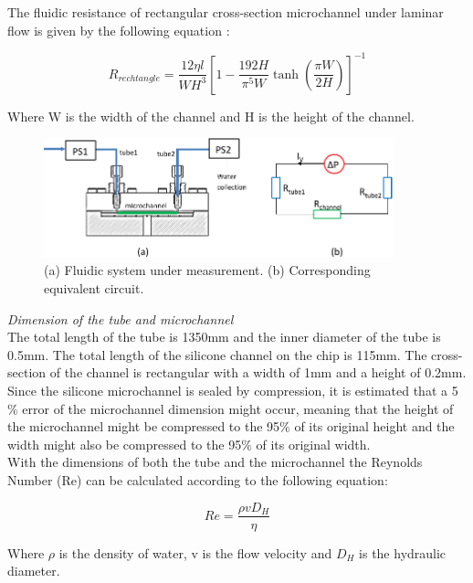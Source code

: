 The fluidic resistance of rectangular cross-section microchannel under laminar flow is given by the following equation \cite{fuerstman2007pressure}:

\begin{equation}
    R_{rechtangle} = \frac{12\eta l}{WH^3}[1-\frac{192H}{\pi ^5 W}\tanh{(\frac{\pi W}{2H})}]^{-1}
    \label{equation4_8}
\end{equation}

Where W is the width of the channel and H is the height of the channel.

\begin{figure}[ht]%
\centering
\includegraphics[width=0.9\textwidth]{figures/packagingandtestunderhighpressure/figure4_18}%
\caption{(a) Fluidic system under measurement. (b) Corresponding equivalent circuit.}%
\label{figure4_18}%
\end{figure}

\noindent \textit{Dimension of the tube and microchannel}\\

The total length of the tube is 1350mm and the inner diameter of the tube is 0.5mm. The total length of the silicone channel on the chip is 115mm. The cross-section of the channel is rectangular with a width of 1mm and a height of 0.2mm. Since the silicone microchannel is sealed by compression, it is estimated that a 5$\%$ error of the microchannel dimension might occur, meaning that the height of the microchannel might be compressed to the 95$\%$ of its original height and the width might also be compressed to the 95$\%$ of its original width.\\

With the dimensions of both the tube and the microchannel the Reynolds Number (Re) can be calculated according to the following equation:

\begin{equation}
    Re=\frac{\rho vD_H}{\eta}
    \label{equation4_9}
\end{equation}

Where $\rho$ is the density of water, v is the flow velocity and $D_H$ is the hydraulic diameter.

